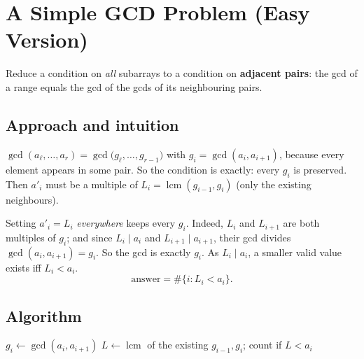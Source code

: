 \section{A Simple GCD Problem (Easy Version)}
\label{sec:n-simple-gcd}


\begin{patternbox}
Reduce a condition on \emph{all} subarrays to a condition on
\textbf{adjacent pairs}: the gcd of a range equals the gcd of the gcds of
its neighbouring pairs.
\end{patternbox}

\subsection*{Approach and intuition}

$\gcd(a_\ell,\dots,a_r)=\gcd\bigl(g_\ell,\dots,g_{r-1}\bigr)$ with
$g_i=\gcd(a_i,a_{i+1})$, because every element appears in some pair. So the
condition is exactly: every $g_i$ is preserved. Then $a'_i$ must be a multiple
of $L_i=\operatorname{lcm}(g_{i-1},g_i)$ (only the existing neighbours).

Setting $a'_i=L_i$ \emph{everywhere} keeps every $g_i$. Indeed, $L_i$ and
$L_{i+1}$ are both multiples of $g_i$; and since $L_i\mid a_i$ and
$L_{i+1}\mid a_{i+1}$, their gcd divides $\gcd(a_i,a_{i+1})=g_i$. So the gcd
is exactly $g_i$. As $L_i\mid a_i$, a smaller valid value exists iff
$L_i<a_i$.
\[
  \text{answer}=\#\{i : L_i<a_i\}.
\]

\subsection*{Algorithm}
\begin{algorithmic}[1]
\State $g_i\gets\gcd(a_i,a_{i+1})$
 \State $L\gets\operatorname{lcm}$ of the existing $g_{i-1},g_i$; count if $L<a_i$ \EndFor
\end{algorithmic}



